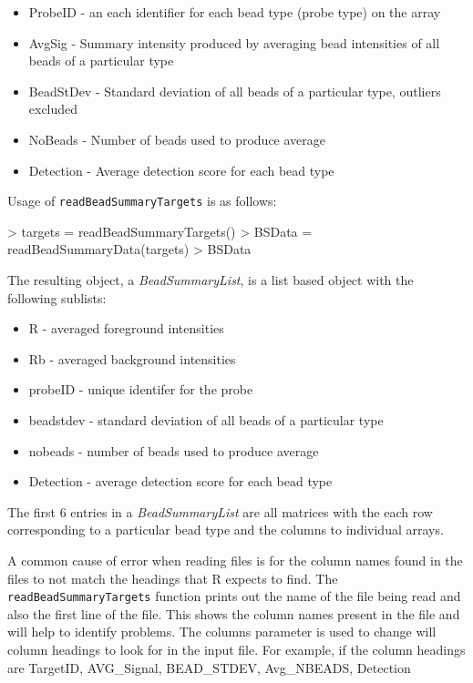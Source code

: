 \documentclass[a4paper]{article}
\newcommand{\Rfunction}[1]{{\texttt{#1}}}
\newcommand{\Rclass}[1]{{\textit{#1}}}
\begin{document}
\begin{itemize}
\item{ProbeID - an each identifier for each bead type (probe type) on the array}
\item{AvgSig - Summary intensity produced by averaging bead intensities of all beads of a particular type}
\item{BeadStDev - Standard deviation of all beads of a particular type, outliers excluded}
\item{NoBeads - Number of beads used to produce average}
\item{Detection - Average detection score for each bead type}
\end{itemize}

Usage of \Rfunction{readBeadSummaryTargets} is as follows:

\begin{Schunk}
\begin{Sinput}
> targets = readBeadSummaryTargets()
> BSData = readBeadSummaryData(targets)
> BSData
\end{Sinput}
\end{Schunk}


The resulting object, a \Rclass{BeadSummaryList}, is a list based object with the following sublists: 

\begin{itemize}
\item{R - averaged foreground intensities}
\item{Rb - averaged background intensities}
\item{probeID - unique identifer for the probe}
\item{beadstdev - standard deviation of all beads of a particular type}
\item{nobeads - number of beads used to produce average}
\item{Detection - average detection score for each bead type}

\end{itemize}

The first 6 entries in a \Rclass{BeadSummaryList} are all matrices with the each row corresponding to a particular bead type and the columns to individual arrays.

A common cause of error when reading files is for the column names found in the files to not match the headings that {\sf R} expects to find. The \Rfunction{readBeadSummaryTargets} function prints out the name of the file being read and also the first line of the file. 
This shows the column names present in the file and will help to
identify problems. The columns parameter is used to change will column
headings to look for in the input file. For example, if the column
headings are TargetID, AVG\_Signal, BEAD\_STDEV, Avg\_NBEADS, Detection
\end{document}
